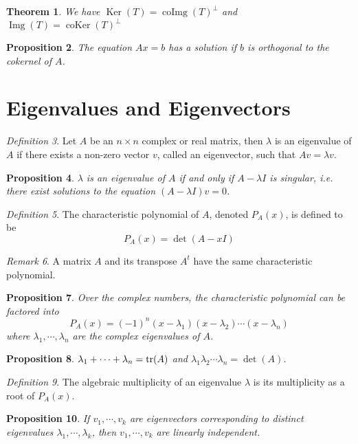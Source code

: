 \documentclass[12pt]{amsart}
\DeclareMathOperator{\coker}{coKer}
\DeclareMathOperator{\coimg}{coImg}
\renewcommand{\ker}{\Ker}
\DeclareMathOperator{\Ker}{Ker}
\DeclareMathOperator{\img}{Img}
\newtheorem{theorem}{Theorem}[section]
\newtheorem{proposition}[theorem]{Proposition}
\theoremstyle{remark}
\newtheorem{remark}[theorem]{Remark}
\newtheorem{definition}[theorem]{Definition}
\numberwithin{equation}{section}
\begin{document}
	\begin{theorem}
		We have $\ker(T)=\coimg(T)^\perp$ and $\img(T)=\coker(T)^\perp$
	\end{theorem}
	
	\begin{proposition}
		The equation $Ax=b$ has a solution if $b$ is orthogonal to the cokernel of $A$.\end{proposition}
	\section{Eigenvalues and Eigenvectors}
	
	\begin{definition}
		Let $A$ be an $n\times n$ complex or real matrix, then $\lambda$ is an eigenvalue of $A$ if there exists a non-zero vector $v$, called an eigenvector, such that $Av=\lambda v$.
	\end{definition}
	\begin{proposition}
		$\lambda$ is an eigenvalue of $A$ if and only if $A-\lambda I$ is singular, i.e. there exist solutions to the equation $(A-\lambda I)v=0$.
	\end{proposition}
	\begin{definition}
		The characteristic polynomial of $A$, denoted $P_A(x)$, is defined to be
		\[P_A(x)=\det(A-x I)\]
	\end{definition}
	\begin{remark}
		A matrix $A$ and its transpose $A^t$ have the same characteristic polynomial.
	\end{remark}
	
	\begin{proposition}
		Over the complex numbers, the characteristic polynomial can be factored into
		\[P_A(x)=(-1)^n(x-\lambda_1)(x-\lambda_2)\cdots(x-\lambda_n)\]
		where $\lambda_1,\cdots,\lambda_n$ are the complex eigenvalues of $A$.
	\end{proposition}
	\begin{proposition}
		$\lambda_1+\cdots+\lambda_n=\textup{tr}(A)$ and $\lambda_1\lambda_2\cdots \lambda_n=\det(A)$.
	\end{proposition}
	\begin{definition}
		The algebraic multiplicity of an eigenvalue $\lambda$ is its multiplicity as a root of $P_A(x)$. 	
		\end{definition}
	
	\begin{proposition}
		If $v_1,\cdots,v_k$ are eigenvectors corresponding to distinct eigenvalues $\lambda_1,\cdots,\lambda_k$, then $v_1,\cdots,v_k$ are linearly independent.
	\end{proposition}
	
\end{document}
